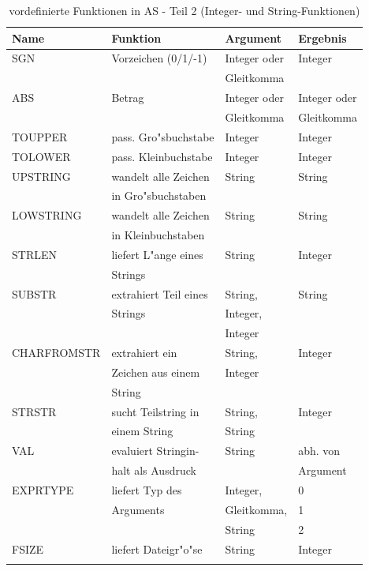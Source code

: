 \documentclass[12pt,a4paper,twoside]{report}
\newcommand{\asname}{AS}
\begin{document}
\begin{center}\begin{longtable}{|l|l|l|l|}
\hline
Name     & Funktion             & Argument & Ergebnis \\
\hline
\hline
SGN         & Vorzeichen (0/1/-1)   & Integer oder & Integer \\
            &                       & Gleitkomma   & \\
ABS         & Betrag                & Integer oder & Integer oder \\
            &                       & Gleitkomma   & Gleitkomma \\
TOUPPER     & pass. Gro"sbuchstabe  & Integer      & Integer \\
TOLOWER     & pass. Kleinbuchstabe  & Integer      & Integer \\
UPSTRING    & wandelt alle Zeichen  & String       & String \\
            & in Gro"sbuchstaben    &              & \\
LOWSTRING   & wandelt alle Zeichen  & String       & String \\
            & in Kleinbuchstaben    &              & \\
STRLEN      & liefert L"ange eines  & String       & Integer \\
            & Strings               &              & \\
SUBSTR      & extrahiert Teil eines & String,      & String \\
            & Strings               & Integer,     & \\
            &                       & Integer      & \\
CHARFROMSTR & extrahiert ein        & String,      & Integer \\
            & Zeichen aus einem     & Integer      & \\
            & String                &              & \\
STRSTR      & sucht Teilstring in   & String,      & Integer \\
            & einem String          & String       & \\
VAL         & evaluiert Stringin-   & String       & abh. von \\
            & halt als Ausdruck     &              & Argument \\
EXPRTYPE    & liefert Typ des       & Integer,     & 0 \\
            & Arguments             & Gleitkomma,  & 1 \\
            &                       & String       & 2 \\
FSIZE       & liefert Dateigr"o"se  & String       & Integer \\
\hline
\caption{vordefinierte Funktionen in \asname{} - Teil 2
         (Integer- und String-Funk\-tio\-nen)\label{TabFuncs2}}
\end{longtable}\end{center}
\end{document}
